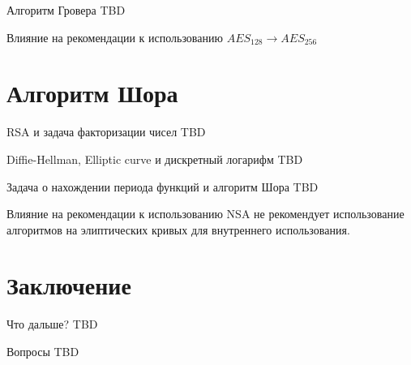\documentclass[10pt,pdf,hyperref={unicode}]{beamer}
\begin{document}
\begin{frame}{Алгоритм Гровера}
TBD
\end{frame}

\begin{frame}{Влияние на рекомендации к использованию}
$AES_{128} \rightarrow AES_{256}$
\end{frame}

\section{Алгоритм Шора}
\begin{frame}{RSA и задача факторизации чисел}
TBD
\end{frame}

\begin{frame}{Diffie-Hellman, Elliptic
curve и дискретный логарифм}
TBD
\end{frame}

\begin{frame}{Задача о нахождении периода функций и алгоритм Шора}
TBD
\end{frame}

\begin{frame}{Влияние на рекомендации к использованию}
NSA не рекомендует использование алгоритмов на элиптических кривых для
внутреннего использования.
\end{frame}

\section{Заключение}
\begin{frame}{Что дальше?}
TBD
\end{frame}

\begin{frame}{Вопросы}
TBD
\end{frame}
\end{document}
